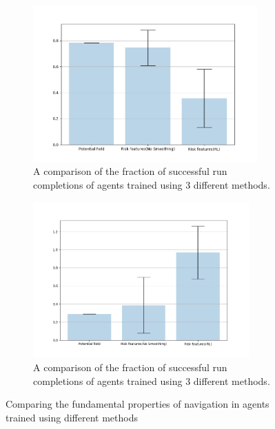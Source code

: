 \begin{figure}[htbp]
    \begin{subfigure}{0.5\textwidth}
        \centering
        \includegraphics[width=0.95\linewidth, height=6cm]{plots/inter_method/goal_reached.png}
        \caption{A comparison of the fraction of successful run completions of agents trained using 3 different methods.}
        \label{fig:inter_method-goal_reached}
    \end{subfigure}
        \begin{subfigure}{0.5\textwidth}
            \centering
        \includegraphics[width=0.95\linewidth, height=6cm]{plots/inter_method/collision_counts.png}
        \caption{A comparison of the fraction of successful run completions of agents trained using 3 different methods.}
        \label{fig:inter_method-collision_counts}
    \end{subfigure}
\caption{Comparing the fundamental properties of navigation in agents trained using different methods}
\end{figure}\\

